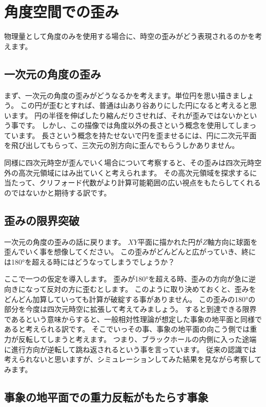 \documentclass[a4paper,12pt,notitlepage]{jsreport}
\begin{document}


\chapter{角度空間での歪み}

物理量として角度のみを使用する場合に、時空の歪みがどう表現されるのかを考えます。

\section{一次元の角度の歪み}

まず、一次元の角度の歪みがどうなるかを考えます。単位円を思い描きましょう。
この円が歪むとすれば、普通は山あり谷ありにした円になると考えると思います。
円の半径を伸ばしたり縮んだりさせれば、それが歪みではないかという事です。
しかし、この描像では角度以外の長さという概念を使用してしまっています。
長さという概念を持たせないで円を歪ませるには、円に二次元平面を飛び出してもらって、三次元の別方向に歪んでもらうしかありません。

同様に四次元時空が歪んでいく場合について考察すると、その歪みは四次元時空外の高次元領域にはみ出ていくと考えられます。
その高次元領域を探求するに当たって、クリフォード代数がより計算可能範囲の広い視点をもたらしてくれるのではないかと期待する訳です。

\section{歪みの限界突破}

一次元の角度の歪みの話に戻ります。
$XY$平面に描かれた円が$Z$軸方向に球面を歪んでいく事を想像してください。
この歪みがどんどんと広がっていき、終には180°を超える時にはどうなってしまうでしょうか？

ここで一つの仮定を導入します。
歪みが180°を超える時、歪みの方向が急に逆向きになって反対の方に歪むとします。
このように取り決めておくと、歪みをどんどん加算していっても計算が破綻する事がありません。
この歪みの180°の部分を今度は四次元時空に拡張して考えてみましょう。
すると到達できる限界であるという意味からすると、一般相対性理論が想定した事象の地平面と同様であると考えられる訳です。
そこでいっその事、事象の地平面の向こう側では重力が反転してしまうと考えます。
つまり、ブラックホールの内側に入った途端に進行方向が逆転して跳ね返されるという事を言っています。
従来の認識では考えられないと思いますが、シミュレーションしてみた結果を見ながら考察してみます。

\section{事象の地平面での重力反転がもたらす事象}
\end{document}
